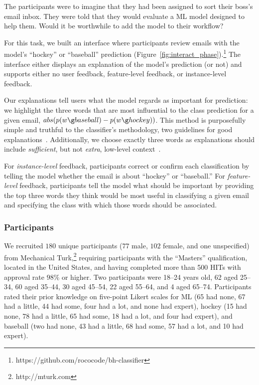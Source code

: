 The participants were to imagine that they had been assigned to sort their boss's email inbox. They were told that they would evaluate a ML model designed to help them. Would it be worthwhile to add the model to their workflow?



For this task, we built an interface where participants review emails with the model's ``hockey'' or ``baseball'' prediction (Figure~\ref{fig:interact_phase}).\footnote{https://github.com/rococode/bh-classifier} The interface either displays an explanation of the model's prediction (or not) and supports either no user feedback, feature-level feedback, or instance-level feedback. 

Our explanations tell users what the model regards as important for prediction: we highlight the three words that are most influential to the class prediction for a given email, $abs(p(w \g baseball) - p(w \g hockey))$. This method is purposefully simple and truthful to the classifier's methodology, two guidelines for good explanations~\cite{Kulesza2013TooModels, Narayanan2018HowExplanation}. Additionally, we choose exactly three words as explanations should include \textit{sufficient}, but not \textit{extra}, low-level context~\cite{Rosenthal2010TowardsData}. 

For \textit{instance-level} feedback, participants correct or confirm each classification by telling the model whether the email is about ``hockey'' or ``baseball.'' For \textit{feature-level} feedback, participants tell the model what should be important by providing the top three words they think would be most useful in classifying a given email and specifying the class with which those words should be associated. %

\subsubsection{Participants}
We recruited $180$ unique participants ($77$ male, $102$ female, and one unspecified) from Mechanical Turk,\footnote{http://mturk.com} requiring participants with the ``Masters'' qualification, located in the United States, and having completed more than 500  HITs with approval rate $98\%$ or higher. 
Two participants were 18--24 years old, 62 aged 25--34, 60 aged 35--44, 30 aged 45--54, 22 aged 55--64, and 4 aged 65--74. Participants rated their prior knowledge on five-point Likert scales for ML (65 had none, 67 had a little, 44 had some, four had a lot, and none had expert), hockey (15 had none, 78 had a little, 65 had some, 18 had a lot, and four had expert), and baseball (two had none, 43 had a little, 68 had some, 57 had a lot, and 10 had expert).

